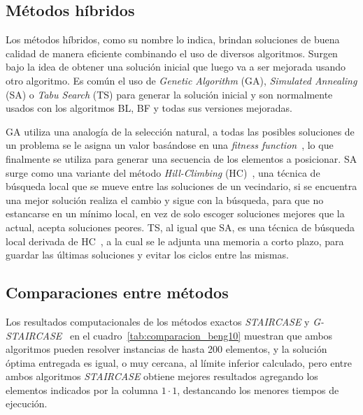 \documentclass[letter, 10pt]{article}
\begin{document}
\subsection{M\'etodos h\'ibridos}

Los m\'etodos h\'ibridos, como su nombre lo indica, brindan soluciones de buena calidad de manera eficiente combinando el uso de diversos algoritmos. Surgen bajo la idea de obtener una soluci\'on inicial que luego va a ser mejorada usando otro algoritmo. Es com\'un el uso de \emph{Genetic Algorithm} (GA), \emph{Simulated Annealing} (SA) o \emph{Tabu Search} (TS) para generar la soluci\'on inicial y son normalmente usados con los algoritmos BL, BF y todas sus versiones mejoradas.

GA utiliza una analog\'ia de la selecci\'on natural, a todas las posibles soluciones de un problema se le asigna un valor bas\'andose en una \emph{fitness function}~\cite{thomas2013hybrid}, lo que finalmente se utiliza para generar una secuencia de los elementos a posicionar. SA surge como una variante del m\'etodo \emph{Hill-Climbing} (HC)~\cite{hopper2001empirical}, una t\'ecnica de b\'usqueda local que se mueve entre las soluciones de un vecindario, si se encuentra una mejor soluci\'on realiza el cambio y sigue con la b\'usqueda, para que no estancarse en un m\'inimo local, en vez de solo escoger soluciones mejores que la actual, acepta soluciones peores. TS, al igual que SA, es una t\'ecnica de b\'usqueda local derivada de HC~\cite{wei2011skyline}, a la cual se le adjunta una memoria a corto plazo, para guardar las \'ultimas soluciones y evitar los ciclos entre las mismas.

\subsection{Comparaciones entre m\'etodos}

Los resultados computacionales de los m\'etodos exactos \emph{STAIRCASE} y \emph{G-STAIRCASE}~\cite{kenmochi2009exact} en el cuadro~\ref{tab:comparacion_beng10} muestran que ambos algoritmos pueden resolver instancias de hasta 200 elementos, y la soluci\'on \'optima entregada es igual, o muy cercana, al l\'imite inferior calculado, pero entre ambos algoritmos \emph{STAIRCASE} obtiene mejores resultados agregando los elementos indicados por la columna $1 \cdot 1$, destancando los menores tiempos de ejecuci\'on.
\end{document}
